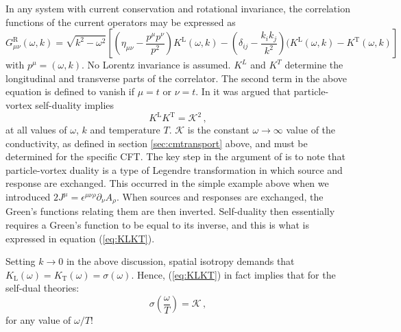 \documentclass[10pt, oneside]{book}
\begin{document}
\begin{doublespace}
In any system with current conservation and rotational invariance, the correlation functions of the current operators may be expressed as \cite{Herzog:2007ij}
\begin{equation}
G^{\mathrm{R}}_{\mu\nu}(\omega,k) = \sqrt{k^2-\omega^2} \left[\left(\eta_{\mu\nu} - \frac{p^\mu p^\nu}{p^2}\right) K^{\mathrm{L}}(\omega,k) - \left(\delta_{ij} - \frac{k_ik_j}{k^2}\right)(K^{\mathrm{L}}(\omega,k) - K^{\mathrm{T}}(\omega,k)\right]  \label{eq:KLKT0}
\end{equation}
with $p^\mu = (\omega,k)$. No Lorentz invariance is assumed. $K^L$ and $K^T$ determine the longitudinal and transverse parts of the correlator. The second term in the above equation is defined to vanish if $\mu=t$ or $\nu=t$.  In \cite{Herzog:2007ij} it was argued that particle-vortex self-duality implies \begin{equation}
K^{\mathrm{L}}K^{\mathrm{T}} = {\mathcal K}^2 \,,  \label{eq:KLKT}
\end{equation}
at all values of $\omega$, $k$ and temperature $T$.  ${\mathcal K}$ is the constant $\omega \to \infty$ value of the conductivity, as defined in section \ref{sec:cmtransport} above, and must be determined for the specific CFT. The key step in the argument of \cite{Herzog:2007ij} is to note that particle-vortex duality is a type of Legendre transformation in which source and response are exchanged. This occurred in the simple example above when we introduced $2J^\mu = \epsilon^{\mu\nu\rho}\partial_\nu A_\rho$. When sources and responses are exchanged, the Green's functions relating them are then inverted. Self-duality then essentially requires a Green's function to be equal to its inverse, and this is what is expressed in equation (\ref{eq:KLKT}).

Setting $k\rightarrow 0$ in the above discussion, spatial isotropy demands that $K_{\mathrm{L}}(\omega)=K_{\mathrm{T}}(\omega) = \sigma(\omega)$.  Hence, (\ref{eq:KLKT}) in fact implies that for the self-dual theories:
\begin{equation}\label{eq:cons}
\sigma\left(\frac{\omega}{T}\right) = {\mathcal K} \,,
\end{equation}
for any value of $\omega/T$!


\end{doublespace}
\end{document}
